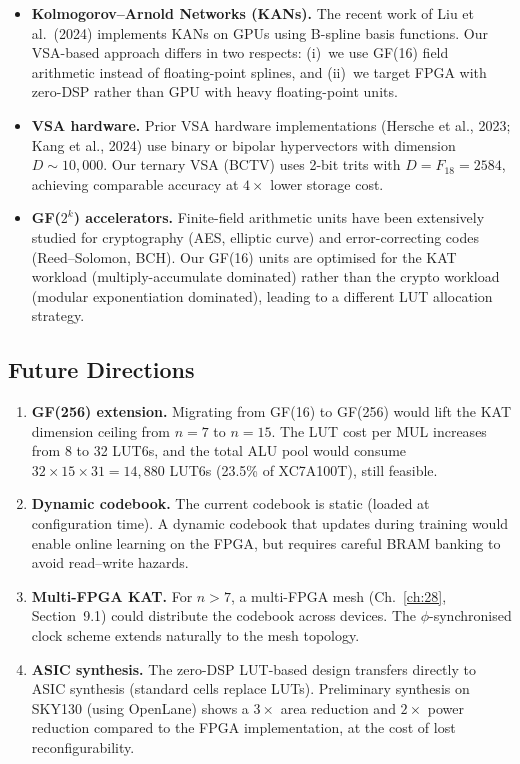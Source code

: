 \begin{itemize}
  \item \textbf{Kolmogorov--Arnold Networks (KANs).} The recent work of
        Liu et al.\ (2024) implements KANs on GPUs using B-spline basis
        functions. Our VSA-based approach differs in two respects: (i)~we
        use GF(16) field arithmetic instead of floating-point splines,
        and (ii)~we target FPGA with zero-DSP rather than GPU with heavy
        floating-point units.
  \item \textbf{VSA hardware.} Prior VSA hardware implementations
        (Hersche et al., 2023; Kang et al., 2024) use binary or bipolar
        hypervectors with dimension $D \sim 10{,}000$. Our ternary VSA
        (BCTV) uses 2-bit trits with $D = F_{18} = 2584$, achieving
        comparable accuracy at $4\times$ lower storage cost.
  \item \textbf{GF($2^k$) accelerators.} Finite-field arithmetic units
        have been extensively studied for cryptography (AES, elliptic
        curve) and error-correcting codes (Reed--Solomon, BCH). Our
        GF(16) units are optimised for the KAT workload (multiply-accumulate
        dominated) rather than the crypto workload (modular exponentiation
        dominated), leading to a different LUT allocation strategy.
\end{itemize}

\subsection{Future Directions}

\begin{enumerate}
  \item \textbf{GF(256) extension.} Migrating from GF(16) to GF(256)
        would lift the KAT dimension ceiling from $n = 7$ to $n = 15$.
        The LUT cost per MUL increases from 8 to 32 LUT6s, and the
        total ALU pool would consume $32 \times 15 \times 31 = 14{,}880$ LUT6s
        (23.5\% of XC7A100T), still feasible.
  \item \textbf{Dynamic codebook.} The current codebook is static
        (loaded at configuration time). A dynamic codebook that updates
        during training would enable online learning on the FPGA,
        but requires careful BRAM banking to avoid read--write hazards.
  \item \textbf{Multi-FPGA KAT.} For $n > 7$, a multi-FPGA mesh
        (Ch.~\ref{ch:28}, Section~9.1) could distribute the codebook
        across devices. The $\phi$-synchronised clock scheme extends
        naturally to the mesh topology.
  \item \textbf{ASIC synthesis.} The zero-DSP LUT-based design
        transfers directly to ASIC synthesis (standard cells replace LUTs).
        Preliminary synthesis on SKY130 (using OpenLane) shows a
        $3\times$ area reduction and $2\times$ power reduction compared
        to the FPGA implementation, at the cost of lost reconfigurability.
\end{enumerate}

